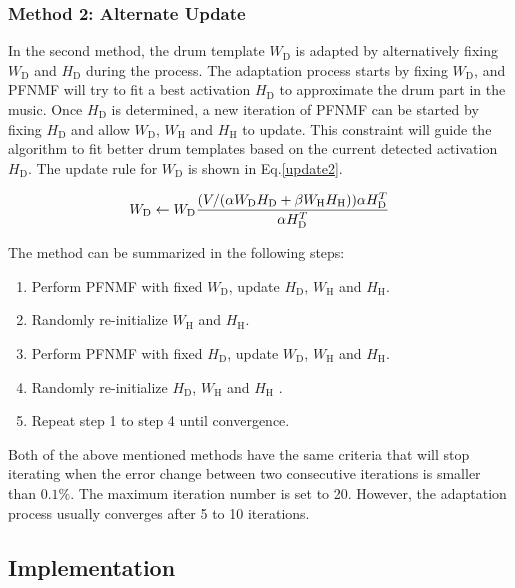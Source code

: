 \documentclass{article}
\begin{document}
\subsubsection{Method 2: Alternate Update}\label{subsubsec:method2}
In the second method, the drum template $W_\mathrm{D}$ is adapted by alternatively fixing $W_\mathrm{D}$ and $H_\mathrm{D}$ during the process. The adaptation process starts by fixing $W_\mathrm{D}$, and PFNMF will try to fit a best activation $H_\mathrm{D}$ to approximate the drum part in the music. Once $H_\mathrm{D}$ is determined, a new iteration of PFNMF can be started by fixing $H_\mathrm{D}$ and allow $W_\mathrm{D}$, $W_\mathrm{H}$ and $H_\mathrm{H}$ to update. This constraint will guide the algorithm to fit better drum templates based on the current detected activation $H_\mathrm{D}$. The update rule for $W_\mathrm{D}$ is shown in Eq.\eqref{update2}. 

\begin{equation}\label{update2}
W_\mathrm{D} \leftarrow W_\mathrm{D}\frac{(V/(\alpha W_\mathrm{D}H_\mathrm{D} + \beta W_\mathrm{H}H_\mathrm{H})) \alpha H_\mathrm{D}^T}{\alpha H_\mathrm{D}^T}\\
\end{equation}

The method can be summarized in the following steps:
\begin{enumerate}
    \item   Perform PFNMF with fixed $W_\mathrm{D}$, update $H_\mathrm{D}$, $W_\mathrm{H}$ and $H_\mathrm{H}$. 
    \item   Randomly re-initialize $W_\mathrm{H}$ and $H_\mathrm{H}$.
    \item   Perform PFNMF with fixed $H_\mathrm{D}$, update $W_\mathrm{D}$, $W_\mathrm{H}$ and $H_\mathrm{H}$.
    \item   Randomly re-initialize $H_\mathrm{D}$, $W_\mathrm{H}$ and $H_\mathrm{H}$ .
    \item   Repeat step 1 to step 4 until convergence. 
\end{enumerate}

Both of the above mentioned methods have the same criteria that will stop iterating when the error change between two consecutive iterations is smaller than $0.1\%$. The maximum iteration number is set to 20. However, the adaptation process usually converges after 5 to 10 iterations. 

\subsection{Implementation}\label{subsec:processing steps}
\end{document}
